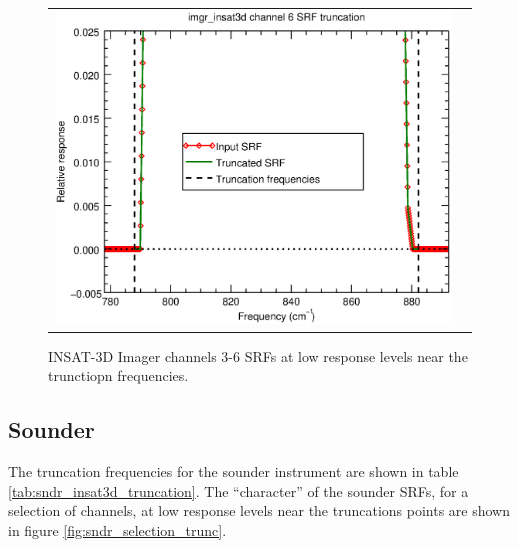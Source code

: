 \begin{figure}[H]
\begin{tabular}{c c}
    \includegraphics[scale=0.35]{graphics/imgr/trunc/imgr_insat3d-6.trunc.eps}
  \end{tabular}
  \caption{INSAT-3D Imager channels 3-6 SRFs at low response levels near the trunctiopn frequencies.}
  \label{fig:imgr_ch3-6_trunc}
\end{figure}


\subsection{Sounder}
The truncation frequencies for the sounder instrument are shown in table \ref{tab:sndr_insat3d_truncation}. The ``character'' of the sounder SRFs, for a selection of channels, at low response levels near the truncations points are shown in figure \ref{fig:sndr_selection_trunc}. 



